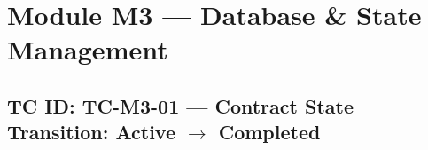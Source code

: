 \documentclass[12pt,a4paper]{article}
\begin{document}
\newpage

\section{Module M3 --- Database \& State Management}

\subsection{TC ID: TC-M3-01 --- Contract State Transition: Active $\rightarrow$ Completed}
\end{document}
